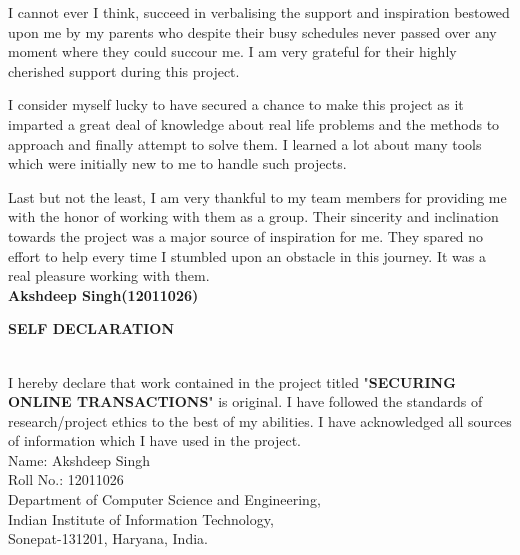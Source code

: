 \documentclass[12pt, oneside, a4paper]{article}
\begin{document}
I cannot ever I think, succeed in verbalising the support and inspiration bestowed upon me by my parents who despite their busy schedules never passed over any moment where they could succour me. I am very grateful for their highly cherished support during this project.

I consider myself lucky to have secured a chance to make this project as it imparted a great deal of knowledge about real life problems and the methods to approach and finally attempt to solve them. I learned a lot about many tools which were initially new to me to handle such projects. 

Last but not the least, I am very thankful to my team members for providing me with the honor of working with them as a group. Their sincerity and inclination towards the project was a major source of inspiration for me. They spared no effort to help every time I stumbled upon an obstacle in this journey. It was a real pleasure working with them.
\vspace{2cm}\\
\textbf{Akshdeep Singh(12011026)}
\setcounter{page}{2}
\pagebreak

\begin{center}
    \begin{Large}\textbf{SELF DECLARATION}\end{Large}
\end{center}\\
\vspace{1cm}
I hereby declare that work contained in the project titled "\textbf{SECURING ONLINE TRANSACTIONS}" is original. I have followed the standards of research/project ethics to the best of my abilities. I have acknowledged all sources of information which I have used in the project.
\vspace{4cm}\\
Name: Akshdeep Singh\\
Roll No.: 12011026\\
Department of Computer Science and Engineering,\\
Indian Institute of Information Technology,\\
Sonepat-131201, Haryana, India.
\pagebreak
\end{document}
